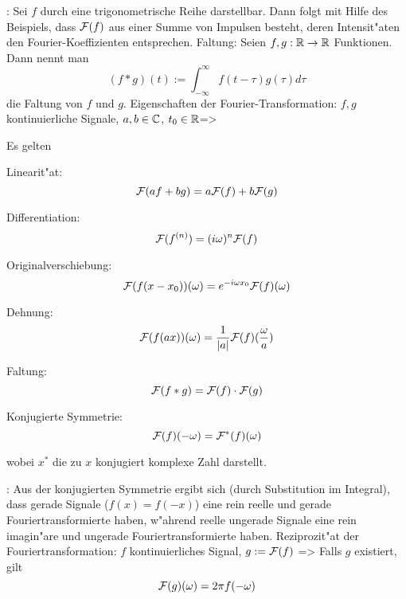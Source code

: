 \remark:{
  Sei $f$ durch eine trigonometrische Reihe darstellbar. Dann folgt mit Hilfe
  des Beispiels, dass $\mathcal{F}(f)$ aus einer Summe von Impulsen besteht, 
  deren Intensit"aten den Fourier-Koeffizienten entsprechen.
}
 Faltung:{
  Seien $f,g:\mathbb R\to\mathbb R$ Funktionen. Dann nennt man
  \[
    (f*g)(t):=\int_{-\infty}^\infty f(t-\tau)g(\tau) d\tau
  \]
  die Faltung von $f$ und $g$.
}
\theorem Eigenschaften der Fourier-Transformation:
  $f,g$ kontinuierliche Signale, $a,b\in\mathbb C$, $t_0\in\mathbb R$=>
{
  Es gelten
  \begin{stmts}
    \item Linearit"at:
      \[
        \mathcal{F}(af+bg)=a\mathcal{F}(f)+b\mathcal{F}(g)
      \]
    \item Differentiation:
      \[
        \mathcal{F}(f^{(n)})=(i\omega)^n \mathcal{F}(f)
      \]
    \item Originalverschiebung:
      \[
        \mathcal{F}(f(x-x_0))(\omega)=e^{-i\omega x_0} \mathcal{F}(f)(\omega)
      \]
    \item Dehnung:
      \[
        \mathcal{F}(f(ax))(\omega)=\frac 1 {|a|} \mathcal{F}(f)(\frac \omega a)
      \]
    \item Faltung:
      \[
        \mathcal{F}(f*g)=\mathcal{F}(f)\cdot \mathcal{F}(g)
      \]
    \item Konjugierte Symmetrie:
      \[
        \mathcal{F}(f)(-\omega)=\mathcal{F}^*(f)(\omega)
      \]
  \end{stmts}
  wobei $x^*$ die zu $x$ konjugiert komplexe Zahl darstellt.
}
\remark:{
  Aus der konjugierten Symmetrie ergibt sich (durch Substitution im Integral), 
  dass gerade Signale ($f(x)=f(-x)$) eine rein reelle und gerade 
  Fouriertransformierte haben, w"ahrend reelle ungerade Signale eine rein
  imagin"are und ungerade Fouriertransformierte haben.
}
\theorem Reziprozit"at der Fouriertransformation:
  $f$ kontinuierliches Signal, $g:=\mathcal{F}(f)$
  =>
{
  Falls $g$ existiert, gilt
  \[
    \mathcal{F}(g)(\omega)=2\pi f(-\omega)
  \]
}
